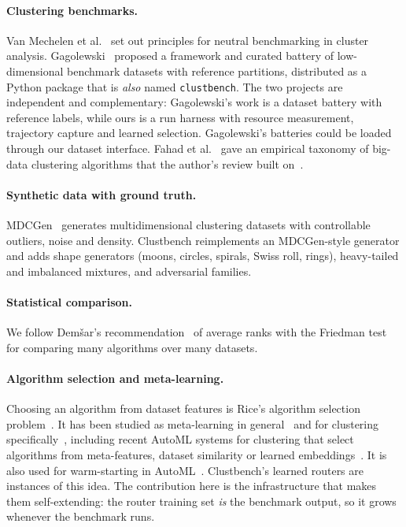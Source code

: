 \documentclass[11pt,a4paper]{article}
\newcommand{\code}[1]{\texttt{#1}}
\begin{document}
\paragraph{Clustering benchmarks.} Van Mechelen et
al.~\cite{vanmechelen2018benchmarking} set out principles for neutral
benchmarking in cluster analysis. Gagolewski~\cite{gagolewski2022framework}
proposed a framework and curated battery of low-dimensional benchmark datasets
with reference partitions, distributed as a Python package that is \emph{also}
named \code{clustbench}. The two projects are independent and complementary:
Gagolewski's work is a dataset battery with reference labels, while ours is a
run harness with resource measurement, trajectory capture and learned
selection. Gagolewski's batteries could be loaded through our dataset
interface. Fahad et al.~\cite{fahad2014survey} gave an empirical taxonomy of
big-data clustering algorithms that the author's review built
on~\cite{maharaj2024review}.

\paragraph{Synthetic data with ground truth.} MDCGen~\cite{iglesias2019mdcgen}
generates multidimensional clustering datasets with controllable outliers,
noise and density. Clustbench reimplements an MDCGen-style generator and adds
shape generators (moons, circles, spirals, Swiss roll, rings), heavy-tailed and
imbalanced mixtures, and adversarial families.

\paragraph{Statistical comparison.} We follow Dem\v{s}ar's
recommendation~\cite{demsar2006statistical} of average ranks with the
Friedman test~\cite{friedman1937use} for comparing many algorithms over many
datasets.

\paragraph{Algorithm selection and meta-learning.} Choosing an algorithm from
dataset features is Rice's algorithm selection
problem~\cite{rice1976algorithm}. It has been studied as meta-learning in
general~\cite{brazdil2009metalearning,pfahringer2000landmarking} and for
clustering
specifically~\cite{desouto2008ranking,ferrari2015clustering}, including recent
AutoML systems for clustering that select algorithms from meta-features,
dataset similarity or learned
embeddings~\cite{trederTschechlov2023ml2dac,singh2024clams,bakhtyari2025clustrecnet}.
It is also used for warm-starting in AutoML~\cite{feurer2015efficient}. Clustbench's learned
routers are instances of this idea. The contribution here is the
infrastructure that makes them self-extending: the router training set
\emph{is} the benchmark output, so it grows whenever the benchmark runs.
\end{document}
